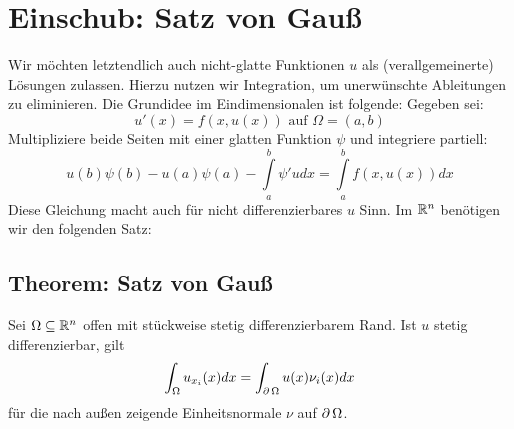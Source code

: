 \section{Einschub: Satz von Gauß}
\label{sec:para5}
Wir möchten letztendlich auch nicht-glatte Funktionen $u$ als (verallgemeinerte)  Lösungen zulassen. Hierzu nutzen wir Integration, um unerwünschte Ableitungen zu eliminieren. Die Grundidee im Eindimensionalen ist folgende: Gegeben sei:
\[ u'(x) = f(x,u(x)) \text{ auf } \Omega = (a,b) \]
Multipliziere beide Seiten mit einer glatten Funktion $\psi$ und integriere partiell:
\[ u(b)\psi(b) - u(a)\psi(a) - \int\limits_{a}^{b} \psi'u dx = \int\limits_{a}^{b} f(x,u(x)) dx \]
Diese Gleichung macht auch für nicht differenzierbares $u$ Sinn. Im $\mathbb{R}^n$ benötigen wir den folgenden Satz:

\subsection{Theorem: Satz von Gauß}
\label{thm_13} \label{gauss}
	Sei $\Omega \subseteq \mathbb{R}^n$ offen mit stückweise stetig differenzierbarem Rand. Ist $u$ stetig differenzierbar, gilt \marginnote{[13]}
	\[ \int_{\Omega} u_{x_i}(x) dx = \int_{\operatorname{\partial} \Omega} u(x) \nu_i(x) dx \]
	für die nach außen zeigende Einheitsnormale $\nu$ auf $\operatorname{\partial}\Omega$.
	
